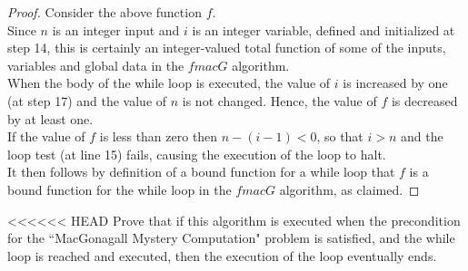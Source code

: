 \documentclass[12pt]{article}
\newenvironment{problem}[2][Problem]{\begin{trivlist}
\item[\hskip \labelsep {\bfseries #1}\hskip \labelsep {\bfseries #2.}]}{\end{trivlist}}
\begin{document}
\begin{proof} Consider the above function $f$. \\

    \noindent Since $n$ is an integer input and $i$ is an integer variable, defined and 
    initialized at step 14, this is certainly an integer-valued total function of
    some of the inputs, variables and global data in the $fmacG$ algorithm. \\

    \noindent When the body of the while loop is executed, the value of $i$ is increased
    by one (at step 17) and the value of $n$ is not changed. Hence, the value of $f$ is
    decreased by at least one. \\

    \noindent If the value of $f$ is less than zero then $n-(i-1) < 0$, so that $i > n$ and the loop
    test (at line 15) fails, causing the execution of the loop to halt. \\

    \noindent It then follows by definition of a bound function for a while loop that $f$ is a bound 
    function for the while loop in the $fmacG$ algorithm, as claimed.
\end{proof}



\begin{problem}{10}
<<<<<<< HEAD
 Prove that if this algorithm is executed when the precondition for the ``MacGonagall Mystery Computation" problem is satisfied, and the while loop is reached and executed, then the execution of the loop eventually ends.
\end{problem}
\end{document}
